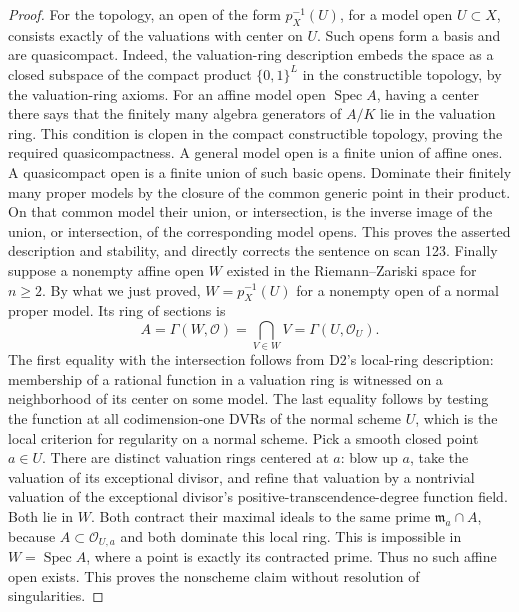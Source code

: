 \begin{proof}
For the topology, an open of the form $p_X^{-1}(U)$, for a model open $U\subset X$, consists exactly of the valuations with center on $U$. Such opens form a basis and are quasicompact. Indeed, the valuation-ring description embeds the space as a closed subspace of the compact product $\{0,1\}^{L}$ in the constructible topology, by the valuation-ring axioms. For an affine model open $\operatorname{Spec}A$, having a center there says that the finitely many algebra generators of $A/K$ lie in the valuation ring. This condition is clopen in the compact constructible topology, proving the required quasicompactness. A general model open is a finite union of affine ones. A quasicompact open is a finite union of such basic opens. Dominate their finitely many proper models by the closure of the common generic point in their product. On that common model their union, or intersection, is the inverse image of the union, or intersection, of the corresponding model opens. This proves the asserted description and stability, and directly corrects the sentence on scan 123.
Finally suppose a nonempty affine open $W$ existed in the Riemann--Zariski space for $n\ge2$. By what we just proved, $W=p_X^{-1}(U)$ for a nonempty open of a normal proper model. Its ring of sections is
\[
 A=\Gamma(W,\mathcal O)=\bigcap_{V\in W}V=\Gamma(U,\mathcal O_U).
\]
The first equality with the intersection follows from D2's local-ring description: membership of a rational function in a valuation ring is witnessed on a neighborhood of its center on some model. The last equality follows by testing the function at all codimension-one DVRs of the normal scheme $U$, which is the local criterion for regularity on a normal scheme. Pick a smooth closed point $a\in U$. There are distinct valuation rings centered at $a$: blow up $a$, take the valuation of its exceptional divisor, and refine that valuation by a nontrivial valuation of the exceptional divisor's positive-transcendence-degree function field. Both lie in $W$. Both contract their maximal ideals to the same prime $\mathfrak m_a\cap A$, because $A\subset\mathcal O_{U,a}$ and both dominate this local ring. This is impossible in $W=\operatorname{Spec}A$, where a point is exactly its contracted prime. Thus no such affine open exists. This proves the nonscheme claim without resolution of singularities.
\end{proof}

